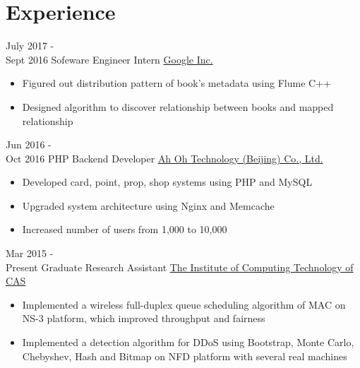 \documentclass[a4paper]{twentysecondcv} %
\begin{document}
\makeprofile %



\section{Experience}

\begin{twenty} %
	\twentyitem
	{July 2017 - \\Sept 2016}
	{Sofeware Engineer Intern}
	{\href{http://www.rgoogle.com/}{Google Inc.}}
	{}
	{
		{\begin{itemize}
				\item Figured out distribution pattern of book's metadata using Flume C++
				\item Designed algorithm to discover relationship between books and mapped  relationship
		\end{itemize}}
	}

	\twentyitem
    	{Jun 2016 - \\Oct 2016}
        {PHP Backend Developer}
        {\href{http://www.runorout.cn/}{Ah Oh Technology (Beijing) Co., Ltd.}}
        {}
        {
        {\begin{itemize}
        \item Developed card, point, prop, shop systems using PHP and MySQL
        \item Upgraded system architecture using Nginx and Memcache
        \item Increased number of users from 1,000 to 10,000
    \end{itemize}}
        }
    
    \twentyitem
	    {Mar 2015 - \\Present}
	    {Graduate Research Assistant}
	    {\href{http://english.ict.cas.cn/}{ The Institute of Computing Technology of CAS}}
	    {}
	    {
    	{\begin{itemize}
    			\item Implemented a wireless full-duplex queue scheduling algorithm of MAC on NS-3 platform, which improved throughput and fairness
    			\item Implemented a detection algorithm for DDoS using Bootstrap, Monte Carlo, Chebyshev, Hash and Bitmap on NFD platform with several real machines
    	\end{itemize}}
    }
        
\end{twenty}
\end{document}
